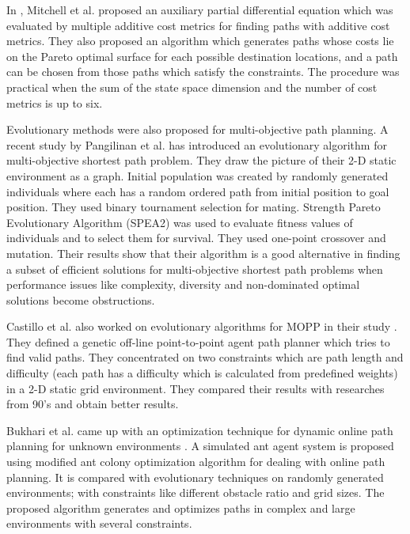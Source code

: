 \documentclass[10pt,journal]{IEEEtran}
\begin{document}
In \cite{Mitchell:2009}, Mitchell et al. 
proposed an auxiliary partial differential equation which was evaluated by multiple additive cost metrics for finding paths with additive cost metrics. 
They also proposed an algorithm which generates paths whose costs lie on the Pareto optimal surface for each possible destination locations, and a path can be chosen from those paths which satisfy the constraints. The procedure was practical when the sum of the state space dimension and the number of cost metrics is up to six.

Evolutionary methods were also proposed for multi-objective path planning. A recent study by Pangilinan et al. \cite{Pangilinan} has introduced an evolutionary algorithm for multi-objective shortest path problem. They draw the picture of their 2-D static environment as a graph. Initial population was created by randomly generated individuals where each has a random ordered path from initial position to goal position. They used binary tournament selection for mating. Strength Pareto Evolutionary Algorithm (SPEA2) \cite{spea2:2001} was used to evaluate fitness values of individuals and to select them for survival. They used one-point crossover and mutation. Their results show that their algorithm is a good alternative in finding a subset of efficient solutions for multi-objective shortest path problems when performance issues like complexity, diversity and non-dominated optimal solutions become obstructions.

Castillo et al. also worked on evolutionary algorithms for MOPP in their study \cite{Castillo:2007}. They defined a genetic off-line point-to-point agent path planner which tries to find valid paths. They concentrated on two constraints which are path length and difficulty (each path has a difficulty which is calculated from predefined weights) in a 2-D static grid environment. They compared their results with researches from 90's and obtain better results.

Bukhari et al. came up with an optimization technique for dynamic online path planning for unknown environments \cite{Bukhari:2010}. A simulated ant agent system is proposed using modified ant colony optimization algorithm for dealing with online path planning. It is compared with evolutionary techniques on randomly generated environments; with constraints like different obstacle ratio and grid sizes. The proposed algorithm generates and optimizes paths in complex and large environments with several constraints.
\end{document}
